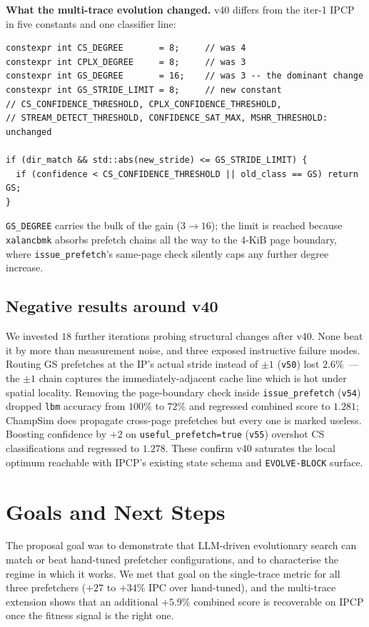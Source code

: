 \documentclass[11pt]{article}
\begin{document}
\textbf{What the multi-trace evolution changed.} v40 differs from the
iter-1 IPCP in five constants and one classifier line:
\begin{lstlisting}
constexpr int CS_DEGREE       = 8;     // was 4
constexpr int CPLX_DEGREE     = 8;     // was 3
constexpr int GS_DEGREE       = 16;    // was 3 -- the dominant change
constexpr int GS_STRIDE_LIMIT = 8;     // new constant
// CS_CONFIDENCE_THRESHOLD, CPLX_CONFIDENCE_THRESHOLD,
// STREAM_DETECT_THRESHOLD, CONFIDENCE_SAT_MAX, MSHR_THRESHOLD: unchanged

if (dir_match && std::abs(new_stride) <= GS_STRIDE_LIMIT) {
  if (confidence < CS_CONFIDENCE_THRESHOLD || old_class == GS) return GS;
}
\end{lstlisting}
\texttt{GS\_DEGREE} carries the bulk of the gain ($3{\to}16$); the
limit is reached because \texttt{xalancbmk} absorbs prefetch chains all
the way to the 4-KiB page boundary, where \texttt{issue\_prefetch}'s
same-page check silently caps any further degree increase.

\subsection{Negative results around v40}

We invested $18$ further iterations probing structural changes after
v40. None beat it by more than measurement noise, and three exposed
instructive failure modes. Routing GS prefetches at the IP's actual
stride instead of $\pm 1$ (\texttt{v50}) lost $2.6\%$~--- the $\pm 1$
chain captures the immediately-adjacent cache line which is hot under
spatial locality. Removing the page-boundary check inside
\texttt{issue\_prefetch} (\texttt{v54}) dropped \texttt{lbm} accuracy
from $100\%$ to $72\%$ and regressed combined score to $1.281$;
ChampSim does propagate cross-page prefetches but every one is marked
useless. Boosting confidence by $+2$ on \texttt{useful\_prefetch=true}
(\texttt{v55}) overshot CS classifications and regressed to $1.278$.
These confirm v40 saturates the local optimum reachable with IPCP's
existing state schema and \texttt{EVOLVE-BLOCK} surface.

\section{Goals and Next Steps}

The proposal goal was to demonstrate that LLM-driven evolutionary
search can match or beat hand-tuned prefetcher configurations, and to
characterise the regime in which it works. We met that goal on the
single-trace metric for all three prefetchers ($+27$ to $+34\%$ IPC
over hand-tuned), and the multi-trace extension shows that an
additional $+5.9\%$ combined score is recoverable on IPCP once the
fitness signal is the right one.
\end{document}
